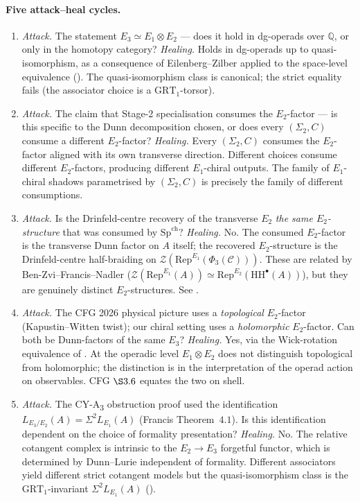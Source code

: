 \documentclass[11pt]{article}
\newcommand{\Eone}{E_{1}}
\newcommand{\Etwo}{E_{2}}
\newcommand{\Ethree}{E_{3}}
\newcommand{\Q}{\mathbb{Q}}
\newcommand{\HH}{\mathrm{HH}}
\newcommand{\SpCh}{\mathrm{Sp}^{\mathrm{ch}}}
\newcommand{\cC}{\mathcal{C}}
\newcommand{\cZ}{\mathcal{Z}}
\newcommand{\Rep}{\mathrm{Rep}}
\begin{document}
\paragraph{Five attack--heal cycles.}
\begin{enumerate}[label=\textbf{Cycle \arabic*:}, leftmargin=2em]
  \item \emph{Attack.} The statement $E_{3} \simeq E_{1} \otimes E_{2}$
    --- does it hold in dg-operads over $\Q$, or only in the homotopy
    category? \emph{Healing.} Holds in dg-operads up to
    quasi-isomorphism, as a consequence of Eilenberg--Zilber applied to
    the space-level equivalence (). The
    quasi-isomorphism class is canonical; the strict equality fails
    (the associator choice is a $\mathrm{GRT}_{1}$-torsor).
  \item \emph{Attack.} The claim that Stage-2 specialisation consumes the
    $\Etwo$-factor --- is this specific to the Dunn decomposition chosen,
    or does every $(\Sigma_{2}, C)$ consume a different $\Etwo$-factor?
    \emph{Healing.} Every $(\Sigma_{2}, C)$ consumes the $\Etwo$-factor
    aligned with its own transverse direction. Different choices consume
    different $\Etwo$-factors, producing different $\Eone$-chiral
    outputs. The family of $\Eone$-chiral shadows parametrised by
    $(\Sigma_{2}, C)$ is precisely the family of different consumptions.
  \item \emph{Attack.} Is the Drinfeld-centre recovery of the transverse
    $\Etwo$ \emph{the same $\Etwo$-structure} that was consumed by
    $\SpCh$? \emph{Healing.} No. The consumed $\Etwo$-factor is the
    transverse Dunn factor on $A$ itself; the recovered $\Etwo$-structure
    is the Drinfeld-centre half-braiding on
    $\cZ(\Rep^{\Eone}(\Phi_{3}(\cC)))$. These are related by
    Ben-Zvi--Francis--Nadler ($\cZ(\Rep^{\Eone}(A)) \simeq
    \Rep^{\Etwo}(\HH^{\bullet}(A))$), but they are genuinely distinct
    $\Etwo$-structures. See .
  \item \emph{Attack.} The CFG 2026 physical picture uses a
    \emph{topological} $E_{2}$-factor (Kapustin--Witten twist); our
    chiral setting uses a \emph{holomorphic} $E_{2}$-factor. Can both be
    Dunn-factors of the same $E_{3}$? \emph{Healing.} Yes, via the
    Wick-rotation equivalence of . At the
    operadic level $E_{1} \otimes E_{2}$ does not distinguish
    topological from holomorphic; the distinction is in the interpretation
    of the operad action on observables. CFG $\S 3.6$ equates the two on
    shell.
  \item \emph{Attack.} The CY-A\textsubscript{3} obstruction proof used the
    identification $L_{\Ethree/\Etwo}(A) = \Sigma^{2} L_{\Eone}(A)$
    (Francis Theorem~$4.1$). Is this identification dependent on the
    choice of formality presentation? \emph{Healing.} No. The relative
    cotangent complex is intrinsic to the $\Etwo \to \Ethree$ forgetful
    functor, which is determined by Dunn--Lurie independent of
    formality. Different associators yield different strict cotangent
    models but the quasi-isomorphism class is the
    $\mathrm{GRT}_{1}$-invariant $\Sigma^{2} L_{\Eone}(A)$
    ().
\end{enumerate}
\end{document}
